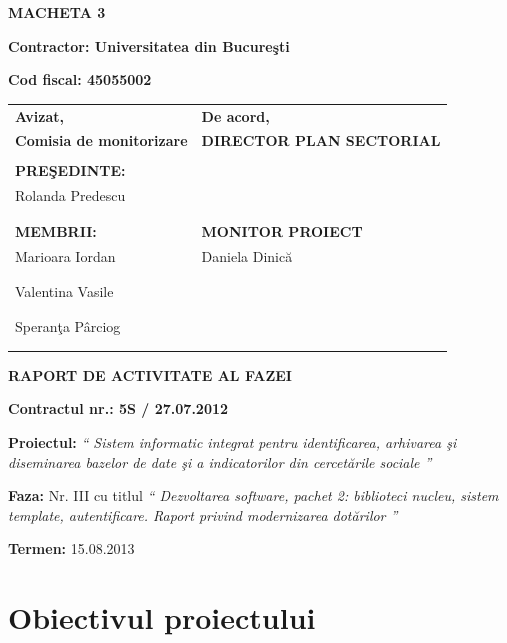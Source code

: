 \documentclass[a4paper, 10pt]{article}
\title{}
\author{}
\date{2013-04-08}
\begin{document}
{\raggedleft\bfseries
MACHETA 3
\par}

{\bfseries
Contractor: Universitatea din Bucure\c{s}ti}

{\textbf{Cod fiscal: 45055002}

\bigskip


\begin{tabular}{@{}l l}
\textbf{Avizat,}&\textbf{De acord,}\\
\textbf{Comisia de monitorizare}&\textbf{DIRECTOR PLAN SECTORIAL}\\
\\
\textbf{PRE\c{S}EDINTE:}&\\
Rolanda Predescu&\\
\\
\\
\textbf{MEMBRII:}&\textbf{MONITOR PROIECT}\\
Marioara Iordan&Daniela Dinic\u{a}\\
\\
\\
Valentina Vasile&\\
\\
\\
Speran\c{t}a P\^{a}rciog\\
\\
\\
\end{tabular}

\bigskip

\bigskip

{\centering\bfseries
RAPORT DE ACTIVITATE AL FAZEI
\par}

\bigskip

{\bfseries
Contractul nr.: 5S / 27.07.2012}

{
\textbf{Proiectul: }
\textit{`` Sistem informatic integrat pentru identificarea, arhivarea \c{s}i diseminarea bazelor de date \c{s}i a indicatorilor din
cercet\u{a}rile sociale ''}}

{
\textbf{Faza: }
Nr. III cu titlul
\textit{`` Dezvoltarea software, pachet 2: biblioteci nucleu, sistem template, autentificare. Raport privind modernizarea dot\u{a}rilor ''}}

{\textbf{Termen:} 15.08.2013}

\medskip

\section{Obiectivul proiectului}

}
\end{document}
